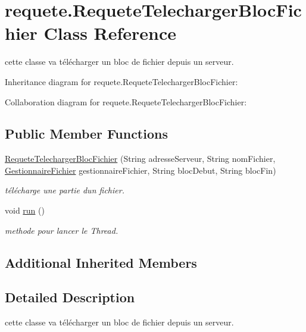 \hypertarget{classrequete_1_1RequeteTelechargerBlocFichier}{}\section{requete.\+Requete\+Telecharger\+Bloc\+Fichier Class Reference}
\label{classrequete_1_1RequeteTelechargerBlocFichier}


cette classe va télécharger un bloc de fichier depuis un serveur.  




Inheritance diagram for requete.\+Requete\+Telecharger\+Bloc\+Fichier\+:


Collaboration diagram for requete.\+Requete\+Telecharger\+Bloc\+Fichier\+:
\subsection*{Public Member Functions}
\begin{DoxyCompactItemize}
\item 
\hyperlink{classrequete_1_1RequeteTelechargerBlocFichier_aff47f4619365925874158d0721f392e6}{Requete\+Telecharger\+Bloc\+Fichier} (String adresse\+Serveur, String nom\+Fichier, \hyperlink{classcommon_1_1GestionnaireFichier}{Gestionnaire\+Fichier} gestionnaire\+Fichier, String bloc\+Debut, String bloc\+Fin)
\begin{DoxyCompactList}\small\item\em télécharge une partie d\textquotesingle{}un fichier. \end{DoxyCompactList}\item 
\mbox{\label{classrequete_1_1RequeteTelechargerBlocFichier_aca582462ab48dda6d3eaa26b6ca7b976}} 
void \hyperlink{classrequete_1_1RequeteTelechargerBlocFichier_aca582462ab48dda6d3eaa26b6ca7b976}{run} ()
\begin{DoxyCompactList}\small\item\em methode pour lancer le Thread. \end{DoxyCompactList}\end{DoxyCompactItemize}
\subsection*{Additional Inherited Members}


\subsection{Detailed Description}
cette classe va télécharger un bloc de fichier depuis un serveur. 


